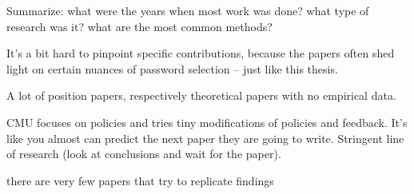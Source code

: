 Summarize: what were the years when most work was done? what type of research was it? what are the most common methods?

It's a bit hard to pinpoint specific contributions, because the papers often shed light on certain nuances of password selection -- just like this thesis.

A lot of position papers, respectively theoretical papers with no empirical data.

CMU focuses on policies and tries tiny modifications of policies and feedback. It's like you almost can predict the next paper they are going to write. Stringent line of research (look at conclusions and wait for the paper).


there are very few papers that try to replicate findings


